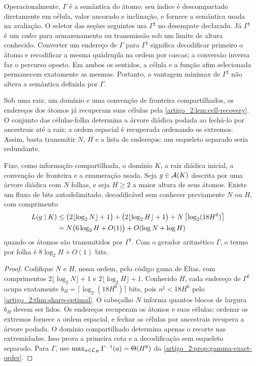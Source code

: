 Operacionalmente, $\Gamma$ é a semântica do átomo: seu índice é descompactado
diretamente em célula, valor ancorado e inclinação, e fornece a semântica usada na avaliação. O seletor das seções seguintes usa $\Gamma^\sharp$ no desempate declarado. Já $\Gamma^\sharp$ é um
\emph{codec} para armazenamento ou transmissão sob um limite de altura
conhecido. Converter um endereço de $\Gamma$ para $\Gamma^\sharp$ significa
decodificar primeiro o átomo e recodificar a mesma quádrupla na ordem por
cascas; a conversão inversa faz o percurso oposto. Em ambos os sentidos, a
célula e a função afim selecionada permanecem exatamente as mesmas. Portanto,
a vantagem minimax de $\Gamma^\sharp$ não altera a semântica definida por
$\Gamma$.

Sob uma raiz, um domínio e uma convenção de fronteira compartilhados, os
endereços dos átomos já recuperam suas células pela
\cref{artigo_2:lem:cell-recovery}. O conjunto das células-folha determina a árvore
diádica podada ao fechá-lo por ancestrais até a raiz; a ordem espacial é
recuperada ordenando os extremos. Assim, basta transmitir $N$, $H$ e a lista
de endereços: um esqueleto separado seria redundante.

\begin{theorem}\label{map:artigo_2:3.9}\label{artigo_2:thm:assembly-serialization}
Fixe, como informação compartilhada, o domínio $K$, a raiz diádica inicial,
a convenção de fronteira e a enumeração usada. Seja $g\in\mathcal{A}(K)$ descrita
por uma árvore diádica com $N$ folhas, e seja $H\ge2$ a maior altura de seus
átomos. Existe um fluxo de bits autodelimitado, decodificável sem conhecer
previamente $N$ ou $H$, com comprimento
\begin{align}
 L(g\mid K)
 &\le \bigl(2\lfloor\log_2N\rfloor+1\bigr)
      +\bigl(2\lfloor\log_2H\rfloor+1\bigr)
      +N\left\lceil\log_2(18H^6)\right\rceil \notag\\
 &=N\bigl(6\log_2H+O(1)\bigr)+O(\log N+\log H)
 \label{artigo_2:eq:assembly-bitrate}
\end{align}
quando os átomos são transmitidos por $\Gamma^\sharp$. Com o gerador
aritmético $\Gamma$, o termo por folha é $8\log_2H+O(1)$ bits.
\end{theorem}

\begin{proof}
Codifique $N$ e $H$, nessa ordem, pelo código gama de Elias, com comprimentos
$2\lfloor\log_2N\rfloor+1$ e
$2\lfloor\log_2H\rfloor+1$. Conhecido $H$, cada endereço de $\Gamma^\sharp$
ocupa exatamente
$b_H=\lceil\log_2(18H^6)\rceil$ bits, pois
$n^\sharp<18H^6$ pelo \cref{artigo_2:thm:sharp-optimal}. O cabeçalho $N$ informa
quantos blocos de largura $b_H$ devem ser lidos. Os endereços recuperam os
átomos e suas células; ordenar os extremos fornece a ordem espacial, e fechar
as células por ancestrais recupera a árvore podada. O domínio compartilhado
determina apenas o recorte nas extremidades. Isso prova a primeira cota e a
decodificação sem esqueleto separado. Para $\Gamma$, use
$\max_{a\in\mathcal{L}_H}\Gamma^{-1}(a)=\Theta(H^8)$ da
\cref{artigo_2:prop:gamma-exact-order}.
\end{proof}

